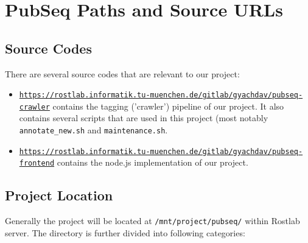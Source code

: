 
\chapter{PubSeq Paths and Source URLs} %

\label{AppendixA} %



\section{Source Codes}

There are several source codes that are relevant to our project:

\begin{itemize}
\item \href{https://rostlab.informatik.tu-muenchen.de/gitlab/gyachdav/pubseq-crawler}{\texttt{https://rostlab.informatik.tu-muenchen.de/gitlab/gyachdav/pubseq-crawler}} contains the tagging ('crawler') pipeline of our project. It also contains several scripts that are used in this project (most notably \texttt{annotate\_new.sh} and \texttt{maintenance.sh}.
\item \href{https://rostlab.informatik.tu-muenchen.de/gitlab/gyachdav/pubseq-frontend}{\texttt{https://rostlab.informatik.tu-muenchen.de/gitlab/gyachdav/pubseq-frontend}} contains the node.js implementation of our project.
\end{itemize}


\section{Project Location}

Generally the project will be located at \texttt{/mnt/project/pubseq/} within Rostlab server. The directory is further divided into following categories:

